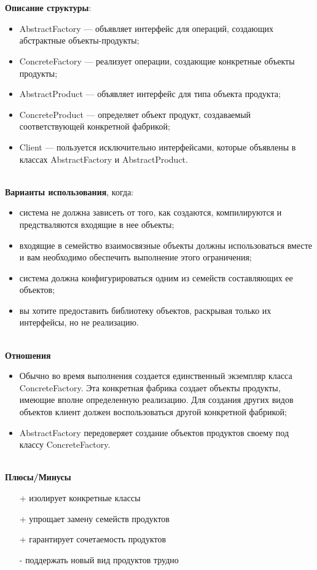 \documentclass[a3paper,11pt]{report}
\begin{document}
\\\\
\textbf{Описание структуры}:
\begin{itemize}
\item AbstractFactory --- объявляет интерфейс для операций, создающих абстрактные объекты-продукты;
\item ConcreteFactory --- реализует операции, создающие конкретные объекты продукты;
\item AbstractProduct --- объявляет интерфейс для типа объекта продукта;
\item ConcreteProduct --- определяет объект продукт, создаваемый соответствующей конкретной фабрикой;
\item Client --- пользуется исключительно интерфейсами, которые объявлены в классах AbstractFactory и AbstractProduct.
\end{itemize}

\large\textbf{\\Варианты использования}, когда:
\begin{itemize}
\item система не должна зависеть от того, как создаются, компилируются и предстваляются входящие в нее объекты;
\item входящие в семейство взаимосвязные объекты должны использоваться вместе и вам необходимо обеспечить выполнение этого ограничения;
\item система должна конфигурироваться одним из семейств составляющих ее объектов;
\item вы хотите предоставить библиотеку объектов, раскрывая только их интерфейсы, но не реализацию.
\end{itemize}

\textbf{\\Отношения}
\begin{itemize}
\item Обычно во время выполнения создается единственный экземпляр класса ConcreteFactory. Эта конкретная фабрика создает объекты продукты, имеющие вполне определенную реализацию. Для создания других видов объектов клиент должен воспользоваться другой конкретной фабрикой;
\item AbstractFactory передоверяет создание объектов продуктов своему под
классу ConcreteFactory.
\end{itemize}


\textbf{\\Плюсы/Минусы}
\begin{itemize}
\item [+] изолирует конкретные классы
\item [+] упрощает замену семейств продуктов
\item [+] гарантирует сочетаемость продуктов
\item [-] поддержать новый вид продуктов трудно
\end{itemize}
\end{document}
